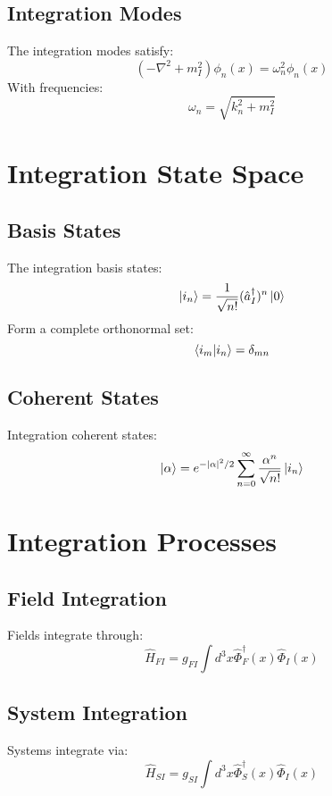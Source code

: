 \documentclass[12pt]{article}
\begin{document}
\subsection{Integration Modes}
The integration modes satisfy:
\begin{equation}
(-\nabla^2 + m_I^2)\phi_n(x) = \omega_n^2\phi_n(x)
\end{equation}
With frequencies:
\begin{equation}
\omega_n = \sqrt{k_n^2 + m_I^2}
\end{equation}
\section{Integration State Space}
\subsection{Basis States}
The integration basis states:
\begin{equation}
\ket{i_n} = \frac{1}{\sqrt{n!}}(\hat{a}_I^\dagger)^n\ket{0}
\end{equation}
Form a complete orthonormal set:
\begin{equation}
\braket{i_m|i_n} = \delta_{mn}
\end{equation}
\subsection{Coherent States}
Integration coherent states:
\begin{equation}
\ket{\alpha} = e^{-|\alpha|^2/2}\sum_{n=0}^\infty \frac{\alpha^n}{\sqrt{n!}}\ket{i_n}
\end{equation}
\section{Integration Processes}
\subsection{Field Integration}
Fields integrate through:
\begin{equation}
\hat{H}_{FI} = g_{FI}\int d^3x \hat{\Phi}_F^\dagger(x)\hat{\Phi}_I(x)
\end{equation}
\subsection{System Integration}
Systems integrate via:
\begin{equation}
\hat{H}_{SI} = g_{SI}\int d^3x \hat{\Phi}_S^\dagger(x)\hat{\Phi}_I(x)
\end{equation}
\end{document}
